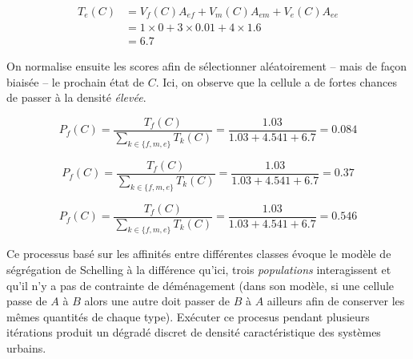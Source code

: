 \documentclass[12pt]{article}
\begin{document}
\begin{align*}
T_e(C) &= V_f(C) A_{ef} + V_m(C) A_{em} + V_e(C) A_{ee} \\
       &= 1 \times 0 + 3 \times 0.01 + 4 \times 1.6 \\
       &= 6.7
\end{align*}

On normalise ensuite les scores afin de sélectionner aléatoirement --
mais de façon biaisée -- le prochain état de $C$. Ici, on observe que
la cellule a de fortes chances de passer à la densité \textit{élevée}.

\begin{equation*}
P_f(C) = \frac{T_f(C)}{\sum_{k \in \{f,m,e\}} T_k(C)} = \frac{1.03}{1.03 + 4.541 + 6.7} = 0.084
\end{equation*}

\begin{equation*}
P_f(C) = \frac{T_f(C)}{\sum_{k \in \{f,m,e\}} T_k(C)} = \frac{1.03}{1.03 + 4.541 + 6.7} = 0.37
\end{equation*}

\begin{equation*}
P_f(C) = \frac{T_f(C)}{\sum_{k \in \{f,m,e\}} T_k(C)} = \frac{1.03}{1.03 + 4.541 + 6.7} = 0.546
\end{equation*}

Ce processus basé sur les affinités entre différentes classes évoque
le modèle de ségrégation de Schelling à la différence qu'ici, trois
\textit{populations} interagissent et qu'il n'y a pas de contrainte de
déménagement (dans son modèle, si une cellule passe de $A$ à $B$ alors
une autre doit passer de $B$ à $A$ ailleurs afin de conserver les
mêmes quantités de chaque type). Exécuter ce procesus pendant
plusieurs itérations produit un dégradé discret de densité
caractéristique des systèmes urbains.
\end{document}
